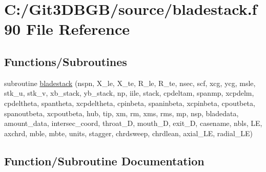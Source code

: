 \hypertarget{bladestack_8f90}{}\section{C\+:/\+Git3\+D\+B\+G\+B/source/bladestack.f90 File Reference}
\label{bladestack_8f90}
\subsection*{Functions/\+Subroutines}
\begin{DoxyCompactItemize}
\item 
subroutine \hyperlink{bladestack_8f90_a5dab74068855acf2e6917b70290ac7ec}{bladestack} (nspn, X\+\_\+le, X\+\_\+te, R\+\_\+le, R\+\_\+te, nsec, scf, xcg, ycg, msle, stk\+\_\+u, stk\+\_\+v, xb\+\_\+stack, yb\+\_\+stack, np, iile, stack, cpdeltam, spanmp, xcpdelm, cpdeltheta, spantheta, xcpdeltheta, cpinbeta, spaninbeta, xcpinbeta, cpoutbeta, spanoutbeta, xcpoutbeta, hub, tip, xm, rm, xms, rms, mp, nsp, bladedata, amount\+\_\+data, intersec\+\_\+coord, throat\+\_\+D, mouth\+\_\+D, exit\+\_\+D, casename, nbls, L\+E, axchrd, mble,                                                                           mbte, units, stagger, chrdsweep, chrdlean, axial\+\_\+\+L\+E, radial\+\_\+\+L\+E)
\end{DoxyCompactItemize}


\subsection{Function/\+Subroutine Documentation}
\hypertarget{bladestack_8f90_a5dab74068855acf2e6917b70290ac7ec}{}
